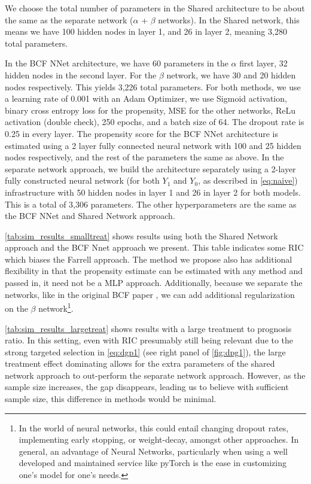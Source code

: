 \documentclass[11pt,  dvipsnames, table, x11name]{article}
\begin{document}
	
	
	
	We choose the total number of parameters in the Shared architecture to be about the same as the separate network ($\alpha$ + $\beta$ networks). In the Shared network, this means we have 100 hidden nodes in layer 1, and 26 in layer 2, meaning 3,280 total parameters. 
	
	In the BCF NNet architecture, we have 60 parameters in the $\alpha$ first layer, 32 hidden nodes in the second layer.  For the $\beta$ network, we have 30 and 20 hidden nodes respectively. This yields 3,226 total parameters.  For both methods, we use a learning rate of 0.001 with an Adam Optimizer, we use Sigmoid activation, binary cross entropy loss for the propensity, MSE for the other networks, ReLu activation (double check), 250 epochs, and a batch size  of 64.  The  dropout  rate is 0.25 in every layer.
	The propensity score for the BCF NNet architecture is estimated using a 2 layer fully connected neural network with 100 and 25 hidden nodes respectively, and the rest of the parameters the same as above.  
In the separate network approach, we build the architecture
	separately using a 2-layer fully constructed neural network  (for both $Y_1$ and $Y_0$, as described in \autoref{eq:naive}) infrastructure with 50 hidden nodes in layer 1 and 26 in layer 2 for both models.  This is a total of 3,306 parameters. The other hyperparameters are the same as the BCF NNet and Shared Network approach.
	
	
	\autoref{tab:sim_results_smalltreat} shows results using both the Shared Network approach \cite{farrell2020deep} and the BCF Nnet approach we present.  This table indicates some RIC which biases the Farrell approach. The method we propose also has additional flexibility in that the propensity estimate can be estimated with any method and passed in, it need not be a MLP approach.  Additionally, because we separate the networks, like in the original BCF paper \cite{hahn2020bayesian}, we can add additional regularization on the $\beta$ network\footnote{In the world of neural networks, this could entail changing dropout rates, implementing early stopping, or weight-decay, amongst other approaches. In general, an advantage of Neural Networks, particularly when using a well developed and maintained service like pyTorch is the ease in customizing one's model for one's needs.}. 
	
	\autoref{tab:sim_results_largetreat} shows results with a large treatment to prognosis ratio.  In this setting, even with RIC presumably still being relevant due to the strong targeted selection in \autoref{eq:dgp1} (see right panel of \autoref{fig:dpg1}), the large treatment effect dominating allows for the extra parameters of the shared network approach to out-perform the separate network approach.  However, as the sample size  increases, the gap disappears, leading us to believe with sufficient sample size, this difference in methods would be minimal.  
	
\end{document}
